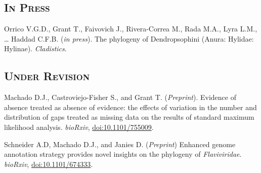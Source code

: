 \subsection{\textsc{In Press}}

	{
	\setlength{\parskip}{.5em}\renewcommand{\baselinestretch}{2.0}
	\begin{hangparas}{.25in}{1}
			
		Orrico V.G.D., Grant T., Faivovich J., Rivera-Correa M., Rada M.A., Lyra L.M., … Haddad C.F.B. (\emph{in press}). The phylogeny of Dendropsophini (Anura: Hylidae: Hylinae). \emph{Cladistics}.
			
	\end{hangparas}
}

\subsection{\textsc{Under Revision}}

	{
	\setlength{\parskip}{.5em}\renewcommand{\baselinestretch}{2.0}
	\begin{hangparas}{.25in}{1}
			
		Machado D.J., Castroviejo-Fisher S., and Grant T. (\emph{Preprint}). Evidence of absence treated as absence of evidence: the effects of variation in the number and distribution of gaps treated as missing data on the results of standard maximum likelihood analysis. \emph{bioRxiv}, \href{https://doi.org/10.1101/755009}{doi:10.1101/755009}.
		
		Schneider A.D,  Machado D.J., and Janies D. (\emph{Preprint}) Enhanced genome annotation strategy provides novel insights on the phylogeny of \emph{Flaviviridae}. \emph{bioRxiv}, \href{http://dx.doi.org/10.1101/674333}{doi:10.1101/674333}.
			
	\end{hangparas}
}
